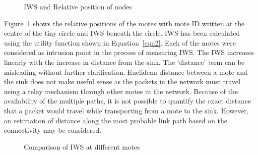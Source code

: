\documentclass[conference,final]{IEEEtran}
\begin{document}
\begin{figure}[t]
    \centering
        \caption{IWS and Relative position of nodes}
    \label{fig:elliptopo} 
\end{figure} 
Figure~\ref{fig:elliptopo} shows the relative positions of the motes with mote ID written at the centre of the tiny circle and IWS beneath the circle.
IWS has been calculated using  the utility function shown in Equation~\ref{eqn2}.
Each of the motes were considered as intrusion point in the process of measuring IWS.
The IWS increases linearly with the increase in distance from the sink.
The `distance' term can be misleading without further clarification.
Euclidean distance between a mote and the sink does not make useful sense as the packets in the network must travel using a relay mechanism through other motes in the network.
Because of the availability of the multiple paths, it is not possible to quantify the exact distance that a packet would travel while transporting from a mote to the sink.
However, an estimation of distance along the most probable link path based on the connectivity may be considered.



\begin{figure}[tbph!]
	\centering
     \caption{Comparison of IWS at different motes}
     \label{fig:ellipgraph}
\end{figure}
\end{document}

